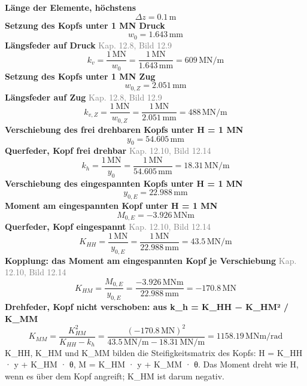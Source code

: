 \documentclass[11pt,a4paper]{article}
\newcommand{\normref}[1]{{\small\textcolor{gray}{#1}}}
\begin{document}
\noindent\textbf{Länge der Elemente, höchstens}
\begin{equation*}
\Delta z = 0.1\,\mathrm{m}
\end{equation*}
\noindent\textbf{Setzung des Kopfs unter 1 MN Druck}
\begin{equation*}
w_0 = 1.643\,\mathrm{mm}
\end{equation*}
\noindent\textbf{Längsfeder auf Druck} \hfill \normref{Kap. 12.8, Bild 12.9}
\begin{equation*}
k_v = \frac{1\,\mathrm{MN}}{w_0} = \frac{1\,\mathrm{MN}}{1.643\,\mathrm{mm}} = 609\,\mathrm{MN}/\mathrm{m}
\end{equation*}
\noindent\textbf{Setzung des Kopfs unter 1 MN Zug}
\begin{equation*}
w_{0,Z} = 2.051\,\mathrm{mm}
\end{equation*}
\noindent\textbf{Längsfeder auf Zug} \hfill \normref{Kap. 12.8, Bild 12.9}
\begin{equation*}
k_{v,Z} = \frac{1\,\mathrm{MN}}{w_{0,Z}} = \frac{1\,\mathrm{MN}}{2.051\,\mathrm{mm}} = 488\,\mathrm{MN}/\mathrm{m}
\end{equation*}
\noindent\textbf{Verschiebung des frei drehbaren Kopfs unter H = 1 MN}
\begin{equation*}
y_0 = 54.605\,\mathrm{mm}
\end{equation*}
\noindent\textbf{Querfeder, Kopf frei drehbar} \hfill \normref{Kap. 12.10, Bild 12.14}
\begin{equation*}
k_h = \frac{1\,\mathrm{MN}}{y_0} = \frac{1\,\mathrm{MN}}{54.605\,\mathrm{mm}} = 18.31\,\mathrm{MN}/\mathrm{m}
\end{equation*}
\noindent\textbf{Verschiebung des eingespannten Kopfs unter H = 1 MN}
\begin{equation*}
y_{0,E} = 22.988\,\mathrm{mm}
\end{equation*}
\noindent\textbf{Moment am eingespannten Kopf unter H = 1 MN}
\begin{equation*}
M_{0,E} = -3.926\,\mathrm{MNm}
\end{equation*}
\noindent\textbf{Querfeder, Kopf eingespannt} \hfill \normref{Kap. 12.10, Bild 12.14}
\begin{equation*}
K_{HH} = \frac{1\,\mathrm{MN}}{y_{0,E}} = \frac{1\,\mathrm{MN}}{22.988\,\mathrm{mm}} = 43.5\,\mathrm{MN}/\mathrm{m}
\end{equation*}
\noindent\textbf{Kopplung: das Moment am eingespannten Kopf je Verschiebung} \hfill \normref{Kap. 12.10, Bild 12.14}
\begin{equation*}
K_{HM} = \frac{M_{0,E}}{y_{0,E}} = \frac{-3.926\,\mathrm{MNm}}{22.988\,\mathrm{mm}} = -170.8\,\mathrm{MN}
\end{equation*}
\noindent\textbf{Drehfeder, Kopf nicht verschoben: aus k\_h = K\_HH − K\_HM² / K\_MM}
\begin{equation*}
K_{MM} = \frac{K_{HM}^{2}}{K_{HH} - k_h} = \frac{\left(-170.8\,\mathrm{MN}\right)^{2}}{43.5\,\mathrm{MN}/\mathrm{m} - 18.31\,\mathrm{MN}/\mathrm{m}} = 1158.19\,\mathrm{MNm}/\mathrm{rad}
\end{equation*}
K\_HH, K\_HM und K\_MM bilden die Steifigkeitsmatrix des Kopfs: H = K\_HH · y + K\_HM · θ, M = K\_HM · y + K\_MM · θ. Das Moment dreht wie H, wenn es über dem Kopf angreift; K\_HM ist darum negativ.
\end{document}
